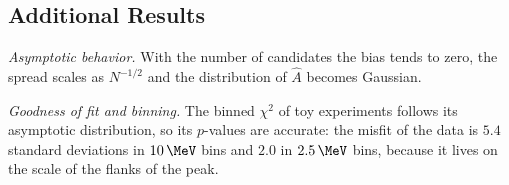 \subsection{Additional Results}
\emph{Asymptotic behavior.} With the number of candidates the bias tends to zero, the spread scales as $N^{-1/2}$ and the distribution of $\hat A$ becomes Gaussian.

\emph{Goodness of fit and binning.} The binned $\chi^2$ of toy experiments follows its asymptotic distribution, so its $p$-values are accurate: the misfit of the data is $5.4$ standard deviations in $10\,\MeV$ bins and $2.0$ in $2.5\,\MeV$ bins, because it lives on the scale of the flanks of the peak.
